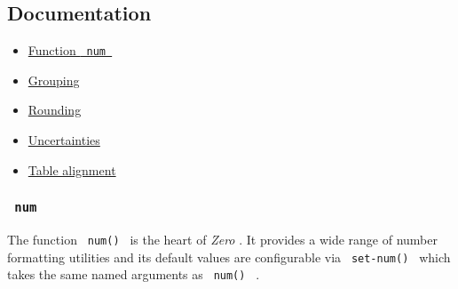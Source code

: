 \subsection{Documentation}\label{documentation}

\begin{itemize}
\tightlist
\item
  \href{https://github.com/typst/packages/raw/main/packages/preview/zero/0.3.0/\#num}{Function
  \texttt{\ num\ }}
\item
  \href{https://github.com/typst/packages/raw/main/packages/preview/zero/0.3.0/\#grouping}{Grouping}
\item
  \href{https://github.com/typst/packages/raw/main/packages/preview/zero/0.3.0/\#rounding}{Rounding}
\item
  \href{https://github.com/typst/packages/raw/main/packages/preview/zero/0.3.0/\#specifying-uncertainties}{Uncertainties}
\item
  \href{https://github.com/typst/packages/raw/main/packages/preview/zero/0.3.0/\#table-alignment}{Table
  alignment}
\end{itemize}

\subsubsection{\texorpdfstring{\texttt{\ num\ }}{ num }}\label{num}

The function \texttt{\ num()\ } is the heart of \emph{Zero} . It
provides a wide range of number formatting utilities and its default
values are configurable via \texttt{\ set-num()\ } which takes the same
named arguments as \texttt{\ num()\ } .

\begin{Shaded}
\begin{Highlighting}[]

\NormalTok{)}
\end{Highlighting}
\end{Shaded}

